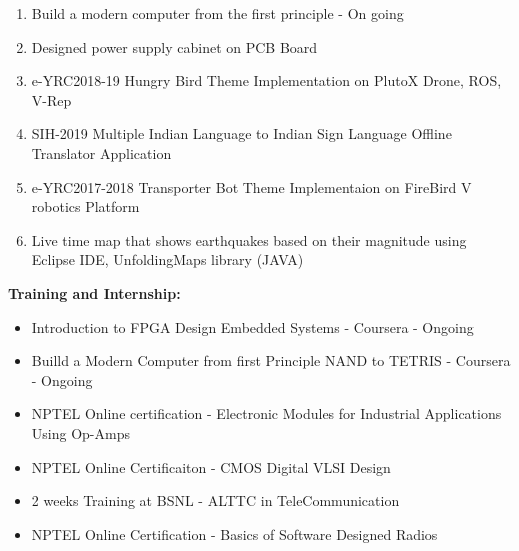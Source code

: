 \documentclass {article}
\begin{document}
\large \begin{enumerate}
		\item Build a modern computer from the first principle - On going
		\item Designed power supply cabinet on PCB Board
		\item e-YRC2018-19 Hungry Bird Theme Implementation on PlutoX Drone, ROS, V-Rep 
		\item SIH-2019 Multiple Indian Language to Indian Sign Language Offline Translator Application
 		\item e-YRC2017-2018 Transporter Bot Theme Implementaion on FireBird V robotics Platform
		\item Live time map that shows earthquakes based on their magnitude using Eclipse IDE, UnfoldingMaps library (JAVA)\\
	\end{enumerate}
\begin {flushleft} \Large \textbf {Training and Internship:} \end{flushleft}
	\begin{itemize}
		\item Introduction to FPGA Design Embedded Systems - Coursera - Ongoing
		\item Builld a Modern Computer from first Principle NAND to TETRIS - Coursera - Ongoing
		\item NPTEL Online certification - Electronic Modules for Industrial Applications Using Op-Amps
		\item NPTEL Online Certificaiton - CMOS Digital VLSI Design
		\item 2 weeks Training at BSNL - ALTTC in TeleCommunication
		\item NPTEL Online Certification - Basics of Software Designed Radios	\\
	\end{itemize}
\newpage
\end{document}
